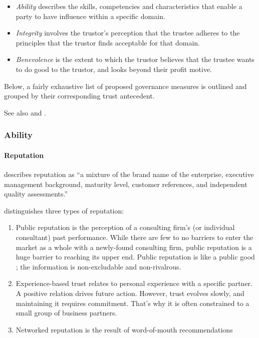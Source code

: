 \documentclass[12pt]{article}
\providecommand{\tightlist}{%
  \setlength{\itemsep}{0pt}\setlength{\parskip}{0pt}}
\begin{document}
\begin{itemize}
\tightlist
\item
  \emph{Ability} describes the skills, competencies and characteristics
  that enable a party to have influence within a specific domain.
\item
  \emph{Integrity} involves the trustor's perception that the trustee
  adheres to the principles that the trustor finds acceptable for that
  domain.
\item
  \emph{Benevolence} is the extent to which the trustor believes that
  the trustee wants to do good to the trustor, and looks beyond their
  profit motive.
\end{itemize}

Below, a fairly exhaustive list of proposed governance measures is
outlined and grouped by their corresponding trust antecedent.

See also \citet{lewicki2006} and \citet{kirilov2012}.

\hypertarget{ability}{%
\subsubsection{Ability}\label{ability}}

\hypertarget{reputation}{%
\paragraph{Reputation}\label{reputation}}

\citet[193]{kirilov2012} describes reputation as ``a mixture of the
brand name of the enterprise, executive management background, maturity
level, customer references, and independent quality assessments.''

\citet[75-76]{armbruster2006} distinguishes three types of reputation:

\begin{enumerate}
\def\labelenumi{\arabic{enumi}.}
\tightlist
\item
  Public reputation is the perception of a consulting firm's (or
  individual consultant) past performance. While there are few to no
  barriers to enter the market as a whole with a newly-found consulting
  firm, public reputation is a huge barrier to reaching its upper end.
  Public reputation is like a public good ; the information is
  non-excludable and non-rivalrous.
\item
  Experience-based trust relates to personal experience with a specific
  partner. A positive relation drives future action. However, trust
  evolves slowly, and maintaining it requires commitment. That's why it
  is often constrained to a small group of business partners.
\item
  Networked reputation is the result of word-of-mouth recommendations
\end{enumerate}
\end{document}
